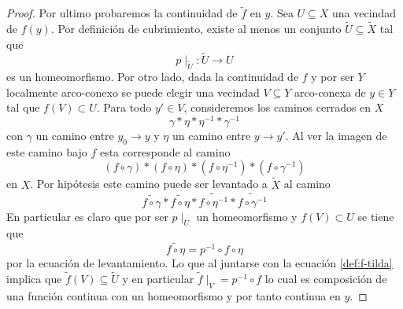 \begin{proof}
  Por ultimo probaremos la continuidad de \(\tilde f\) en \(y\). Sea \(U
  \subseteq X\) una vecindad de \(f (y)\). Por definición de cubrimiento,
  existe al menos un conjunto \(\tilde U \subseteq \tilde X\) tal que
  \[p \mid_{\tilde U} : \tilde U \to U\]
  es un homeomorfismo. Por otro lado, dada la continuidad de \(f\) y
  por ser \(Y\) localmente arco-conexo se puede elegir una vecindad \(V
  \subseteq Y\) arco-conexa de \(y \in Y\) tal que \(f (V) \subset U\).
  Para todo \(y' \in V\), consideremos los caminos cerrados en \(X\)
  \[ \gamma * \eta * \eta^{-1} * \gamma^{-1} \]
  con \(\gamma\) un camino entre \(y_0 \to y\) y \(\eta\) un camino
  entre \(y \to y'\). Al ver la imagen de este camino bajo \(f\) esta
  corresponde al camino
  \[ (f \circ \gamma) * (f \circ \eta) * (f \circ \eta^{-1}) * (f \circ
    \gamma^{-1}) \]
  en \(X\). Por hipótesis este camino puede ser levantado a
  \(\tilde X\) al camino
  \[ \widetilde{f \circ \gamma} * \widetilde{f \circ \eta} *
    \widetilde{f \circ \eta^{-1}} * \widetilde{f \circ \gamma^{-1}} \]
  En particular es claro que por ser \(p \mid_U\) un homeomorfismo y \(f
  (V) \subset U\) se tiene que
  \[ \widetilde{f \circ \eta} = p^{-1} \circ f \circ \eta \]
  por la ecuación de levantamiento. Lo que al juntarse con la ecuación
  \eqref{def:f-tilda} implica que \(\tilde f (V) \subseteq \tilde U\) y en
  particular \( \tilde f \mid _{V} = p^{-1} \circ f \) lo cual es
  composición de una función continua con un homeomorfismo y por tanto
  continua en \(y\).
\end{proof}


